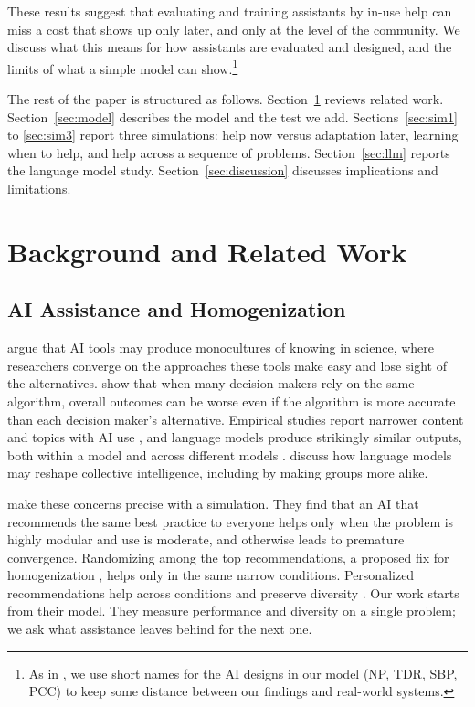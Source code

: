\documentclass[11pt]{article}
\begin{document}
These results suggest that evaluating and training assistants by in-use help can miss a cost that shows up only later, and only at the level of the community. We discuss what this means for how assistants are evaluated and designed, and the limits of what a simple model can show.\footnote{As in \citet{fazelpour2026navigating}, we use short names for the AI designs in our model (NP, TDR, SBP, PCC) to keep some distance between our findings and real-world systems.}

The rest of the paper is structured as follows. Section~\ref{sec:background} reviews related work. Section~\ref{sec:model} describes the model and the test we add. Sections~\ref{sec:sim1} to \ref{sec:sim3} report three simulations: help now versus adaptation later, learning when to help, and help across a sequence of problems. Section~\ref{sec:llm} reports the language model study. Section~\ref{sec:discussion} discusses implications and limitations.

\section{Background and Related Work}
\label{sec:background}

\subsection{AI Assistance and Homogenization}

\citet{messeri2024artificial} argue that AI tools may produce monocultures of knowing in science, where researchers converge on the approaches these tools make easy and lose sight of the alternatives. \citet{kleinberg2021algorithmic} show that when many decision makers rely on the same algorithm, overall outcomes can be worse even if the algorithm is more accurate than each decision maker's alternative. Empirical studies report narrower content and topics with AI use \citep{doshi2024generative,hao2026artificial}, and language models produce strikingly similar outputs, both within a model and across different models \citep{jiang2025artificial}. \citet{burton2024large} discuss how language models may reshape collective intelligence, including by making groups more alike.

\citet{fazelpour2026navigating} make these concerns precise with a simulation. They find that an AI that recommends the same best practice to everyone helps only when the problem is highly modular and use is moderate, and otherwise leads to premature convergence. Randomizing among the top recommendations, a proposed fix for homogenization \citep{jain2024scarce}, helps only in the same narrow conditions. Personalized recommendations help across conditions and preserve diversity \citep[see also][]{obrien2025epistemic}. Our work starts from their model. They measure performance and diversity on a single problem; we ask what assistance leaves behind for the next one.
\end{document}
